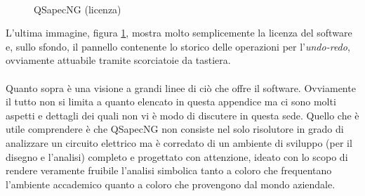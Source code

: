 \begin{figure}[ht]
 \centering
 \\
 \caption{QSapecNG (licenza)}
 \label{fig:qsapecng-lic}
\end{figure}

L'ultima immagine, figura \ref{fig:qsapecng-lic}, mostra molto semplicemente la licenza del software e, sullo sfondo, il pannello contenente lo storico delle operazioni per l'\textit{undo-redo}, ovviamente attuabile tramite scorciatoie da tastiera.

\paragraph{}

Quanto sopra è una visione a grandi linee di ciò che offre il software. Ovviamente il tutto non si limita a quanto elencato in questa appendice ma ci sono molti aspetti e dettagli dei quali non vi è modo di discutere in questa sede. Quello che è utile comprendere è che QSapecNG non consiste nel solo risolutore in grado di analizzare un circuito elettrico ma è corredato di un ambiente di sviluppo (per il disegno e l'analisi) completo e progettato con attenzione, ideato con lo scopo di rendere veramente fruibile l'analisi simbolica tanto a coloro che frequentano l'ambiente accademico quanto a coloro che provengono dal mondo aziendale.
